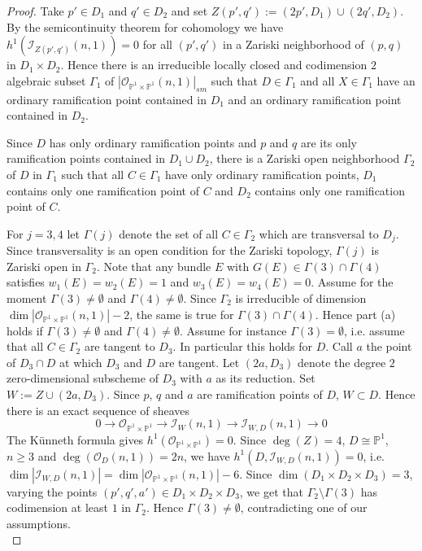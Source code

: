\documentclass[10pt,a4paper]{amsart}
\theoremstyle{plain}
\theoremstyle{definition}
\theoremstyle{remark}
\begin{document}
\begin{proof}
Take $p'\in D_1$ and $q'\in D_2$ and set
$Z(p',q'):= (2p',D_1)\cup (2q',D_2)$. By the semicontinuity theorem for cohomology  \cite[Th. III.13.8]{h} we have  $h^1(\mathcal I_{Z(p',q')}(n,1))=0$
for all $(p',q')$ in a Zariski neighborhood of $(p,q)$ in $D_1\times D_2$. Hence there is an irreducible locally closed and codimension $2$ algebraic subset $\Gamma_1$ of $|\mathcal O_{\mathbb P^1\times \mathbb P^1}(n,1)|_{sm}$ such that $D\in \Gamma_1$ and
all $X\in \Gamma_1 $  have an ordinary ramification point contained in $D_1$ and an ordinary ramification point contained in $D_2$. 

Since $D$ has only ordinary ramification points and $p$ and $q$ are its only ramification points contained in $D_1\cup D_2$, there is a Zariski open neighborhood $\Gamma_2$ of $D$ in $\Gamma_1$ such that all $C\in \Gamma_1$ have only ordinary ramification points, $D_1$ contains only one ramification point of $C$ and $D_2$
contains only one ramification point of $C$.

For $j=3,4$ let $\Gamma(j)$ denote the set of all $C\in \Gamma_2$ which are transversal to $D_j$. Since transversality is an open condition for the Zariski topology, $\Gamma(j)$ is Zariski open in $\Gamma_2$. Note that any bundle $E$ with $G(E)\in \Gamma(3)\cap \Gamma(4)$ satisfies $w_1(E)=w_2(E)=1$ and $w_3(E)=w_4(E)=0$. Assume for the moment $\Gamma(3)\ne \emptyset$ and $\Gamma(4)\ne \emptyset$. Since $\Gamma_2$ is irreducible of dimension $\dim |\mathcal O_{\mathbb P^1\times \mathbb P^1}(n,1)|-2$, the same is true for $\Gamma(3)\cap \Gamma(4)$. Hence part (a) holds if $\Gamma(3)\ne \emptyset$ and $\Gamma(4)\ne \emptyset$.
Assume for instance $\Gamma(3)=\emptyset$, i.e. assume that all $C\in \Gamma_2$ are tangent to $D_3$. In particular this holds for $D$. Call $a$ the point of $D_3\cap D$ at which $D_3$ and $D$ are tangent. Let $(2a,D_3)$ denote the degree $2$ zero-dimensional subscheme of $D_3$ with $a$ as its reduction. Set $W:= Z\cup (2a,D_3)$. Since $p$, $q$ and $a$ are ramification points of $D$, $W\subset D$. Hence there is an exact sequence of sheaves
\begin{equation}\label{eqb2}
0\to \mathcal O_{\mathbb P^1\times \mathbb P^1}\to \mathcal I_W(n,1)\to \mathcal I_{W,D}(n,1)\to 0
\end{equation}
 The K\"{u}nneth formula gives $h^1(\mathcal O_{\mathbb P^1\times \mathbb P^1})=0$. Since $\deg(Z)=4$, $D\cong \mathbb P^1$, $n\ge 3$ and $\deg(\mathcal O_D(n,1)) =2n$, we have
$h^1(D,\mathcal I_{W,D}(n,1)) =0$, i.e. $\dim |\mathcal I_{W,D}(n,1)| =\dim |\mathcal O_{\mathbb P^1\times \mathbb P^1}(n,1)|-6$. Since $\dim (D_1\times D_2\times D_3)=3$, varying the points $(p',q',a')
\in D_1\times D_2\times D_3$, we get that $\Gamma_2\setminus \Gamma(3)$ has codimension at least $1$ in $\Gamma_2$.
Hence $\Gamma(3)\ne \emptyset$, contradicting one of our assumptions. \\


\end{proof}
\end{document}
